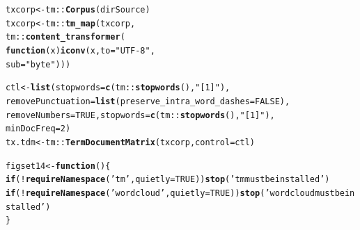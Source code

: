 \documentclass[12pt, a4paper,  BCOR=8.25mm, DIV=15]{scrartcl}\usepackage[]{graphicx}\usepackage[]{color}
\makeatletter
\newcommand{\hlnum}[1]{\textcolor[rgb]{0.686,0.059,0.569}{#1}}%
\newcommand{\hlstr}[1]{\textcolor[rgb]{0.192,0.494,0.8}{#1}}%
\newcommand{\hlopt}[1]{\textcolor[rgb]{0,0,0}{#1}}%
\newcommand{\hlstd}[1]{\textcolor[rgb]{0.345,0.345,0.345}{#1}}%
\newcommand{\hlkwa}[1]{\textcolor[rgb]{0.161,0.373,0.58}{\textbf{#1}}}%
\newcommand{\hlkwb}[1]{\textcolor[rgb]{0.69,0.353,0.396}{#1}}%
\newcommand{\hlkwc}[1]{\textcolor[rgb]{0.333,0.667,0.333}{#1}}%
\newcommand{\hlkwd}[1]{\textcolor[rgb]{0.737,0.353,0.396}{\textbf{#1}}}%
\newenvironment{kframe}{%
 \def\at@end@of@kframe{}%
 \ifinner\ifhmode%
  \def\at@end@of@kframe{\end{minipage}}%
  \begin{minipage}{\columnwidth}%
 \fi\fi%
 \def\FrameCommand##1{\hskip\@totalleftmargin \hskip-\fboxsep
 \colorbox{shadecolor}{##1}\hskip-\fboxsep
     \hskip-\linewidth \hskip-\@totalleftmargin \hskip\columnwidth}%
 \MakeFramed {\advance\hsize-\width
   \@totalleftmargin\z@ \linewidth\hsize
   \@setminipage}}%
 {\par\unskip\endMakeFramed%
 \at@end@of@kframe}
\newenvironment{knitrout}{}{} %
\makeatother
\begin{document}
\begin{knitrout}
\color{fgcolor}\begin{kframe}
\begin{alltt}
\hlstd{txcorp} \hlkwb{<-} \hlstd{tm}\hlopt{::}\hlkwd{Corpus}\hlstd{(dirSource)}
\hlstd{txcorp} \hlkwb{<-} \hlstd{tm}\hlopt{::}\hlkwd{tm_map}\hlstd{(txcorp,}
                 \hlstd{tm}\hlopt{::}\hlkwd{content_transformer}\hlstd{(}
                     \hlkwa{function}\hlstd{(}\hlkwc{x}\hlstd{)} \hlkwd{iconv}\hlstd{(x,} \hlkwc{to}\hlstd{=}\hlstr{"UTF-8"}\hlstd{,}
                                       \hlkwc{sub} \hlstd{=} \hlstr{"byte"}\hlstd{)))}
\end{alltt}
\end{kframe}
\end{knitrout}
\begin{knitrout}
\color{fgcolor}\begin{kframe}
\begin{alltt}
\hlstd{ctl} \hlkwb{<-} \hlkwd{list}\hlstd{(}\hlkwc{stopwords} \hlstd{=} \hlkwd{c}\hlstd{(tm}\hlopt{::}\hlkwd{stopwords}\hlstd{(),} \hlstr{"[1]"}\hlstd{),}
            \hlkwc{removePunctuation} \hlstd{=} \hlkwd{list}\hlstd{(}\hlkwc{preserve_intra_word_dashes} \hlstd{=} \hlnum{FALSE}\hlstd{),}
            \hlkwc{removeNumbers} \hlstd{=} \hlnum{TRUE}\hlstd{,} \hlkwc{stopwords}\hlstd{=}\hlkwd{c}\hlstd{(tm}\hlopt{::}\hlkwd{stopwords}\hlstd{(),} \hlstr{"[1]"}\hlstd{),}
            \hlkwc{minDocFreq} \hlstd{=} \hlnum{2}\hlstd{)}
\hlstd{tx.tdm} \hlkwb{<-} \hlstd{tm}\hlopt{::}\hlkwd{TermDocumentMatrix}\hlstd{(txcorp,} \hlkwc{control}\hlstd{=ctl)}
\end{alltt}
\end{kframe}
\end{knitrout}
\begin{knitrout}
\color{fgcolor}\begin{kframe}
\begin{alltt}
\hlstd{figset14} \hlkwb{<-} \hlkwa{function}\hlstd{()\{}
  \hlkwa{if}\hlstd{(}\hlopt{!}\hlkwd{requireNamespace}\hlstd{(}\hlstr{'tm'}\hlstd{,} \hlkwc{quietly} \hlstd{=} \hlnum{TRUE}\hlstd{))}\hlkwd{stop}\hlstd{(}\hlstr{'tm must be installed'}\hlstd{)}
  \hlkwa{if}\hlstd{(}\hlopt{!}\hlkwd{requireNamespace}\hlstd{(}\hlstr{'wordcloud'}\hlstd{,} \hlkwc{quietly}\hlstd{=}\hlnum{TRUE}\hlstd{))}\hlkwd{stop}\hlstd{(}\hlstr{'wordcloud must be installed'}\hlstd{)}
  \hlstd{\}}
\end{alltt}
\end{kframe}
\end{knitrout}
\end{document}
